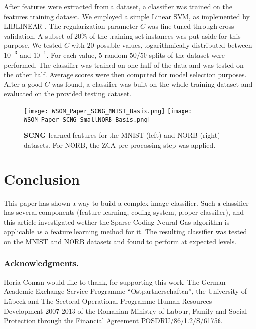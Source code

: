 \documentclass[runningheads,a4paper]{llncs}
\begin{document}
After features were extracted from a dataset, a classifier was trained on the features training dataset. We employed a simple Linear SVM, as implemented by LIBLINEAR \cite{liblinear}. The regularization parameter $C$ was fine-tuned through cross-validation. A subset of $20\%$ of the training set instances was put aside for this purpose. We tested $C$ with $20$ possible values, logarithmically distributed between $10^{-3}$ and $10^{-1}$. For each value, $5$ random $50/50$ splits of the dataset were performed. The classifier was trained on one half of the data and was tested on the other half. Average scores were then computed for model selection purposes. After a good $C$ was found, a classifier was built on the whole training dataset and evaluated on the provided testing dataset.

\begin{figure}
\centering
\texttt{[image: WSOM\_Paper\_SCNG\_MNIST\_Basis.png]}
\texttt{[image: WSOM\_Paper\_SCNG\_SmallNORB\_Basis.png]}
\caption{\textbf{SCNG} learned features for the MNIST (left) and NORB (right) datasets. For NORB, the ZCA pre-processing step was applied.}
\label{fig:LearnedFigures}
\end{figure}

\section{Conclusion}

This paper has shown a way to build a complex image classifier. Such a classifier has several components (feature learning, coding system, proper classifier), and this article investigated wether the Sparse Coding Neural Gas algorithm is applicable as a feature learning method for it. The resulting classifier was tested on the MNIST and NORB datasets and found to perform at expected levels.

\subsubsection*{Acknowledgments.} Horia Coman would like to thank, for supporting this work, The German Academic Exchange Service Programme ``Ostpartnerschaften'', the University of L\"{u}beck  and The Sectoral Operational Programme Human Resources Development 2007-2013 of the Romanian Ministry of Labour, Family and Social Protection through the Financial Agreement POSDRU/86/1.2/S/61756.
\end{document}
